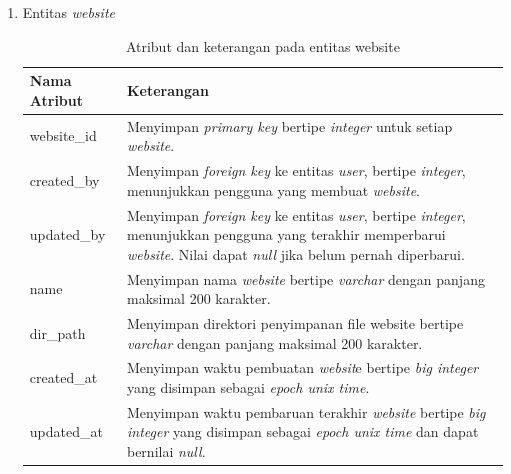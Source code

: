 \begin{enumerate}[label*=\arabic*.,ref=\arabic*]
\begin{enumerate}[label=\arabic*.]
        \item Entitas \textit{website}
        \vspace{-0.5em}
        \begin{table}[H]
            \centering
            \begin{tabular}{|p{3.25cm}|p{8cm}|}
                \hline
                \rowcolor[HTML]{DAE8FC} 
                {\color[HTML]{000000} Nama Atribut} & {\color[HTML]{000000} Keterangan}           \\ \hline
                website\_id                        & Menyimpan \textit{primary key} bertipe \textit{integer} untuk setiap \textit{website}. \\ \hline
                created\_by                        & Menyimpan \textit{foreign key} ke entitas \textit{user}, bertipe \textit{integer}, menunjukkan pengguna yang membuat \textit{website}. \\ \hline
                updated\_by                        & Menyimpan \textit{foreign key} ke entitas \textit{user}, bertipe \textit{integer}, menunjukkan pengguna yang terakhir memperbarui \textit{website}. Nilai dapat \textit{null} jika belum pernah diperbarui. \\ \hline
                name                               & Menyimpan nama \textit{website} bertipe \textit{varchar} dengan panjang maksimal 200 karakter. \\ \hline
                dir\_path                          & Menyimpan direktori penyimpanan file website bertipe \textit{varchar} dengan panjang maksimal 200 karakter. \\ \hline
                created\_at                        & Menyimpan waktu pembuatan \textit{websit}e bertipe \textit{big integer} yang disimpan sebagai \textit{epoch unix time}. \\ \hline
                updated\_at                        & Menyimpan waktu pembaruan terakhir \textit{website} bertipe \textit{big integer} yang disimpan sebagai \textit{epoch unix time} dan dapat bernilai \textit{null}. \\ \hline
            \end{tabular}
            \caption{Atribut dan keterangan pada entitas website}
            \label{tab:website_entity}
        \end{table}


\end{enumerate}
\end{enumerate}
